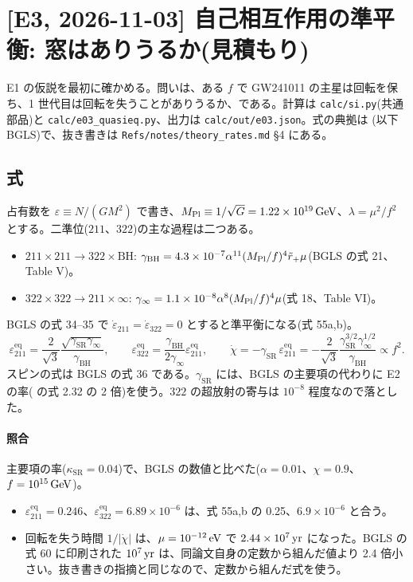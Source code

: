 \section{[E3, 2026-11-03] 自己相互作用の準平衡: 窓はありうるか(見積もり)}\label{sec:e03}

E1 の仮説を最初に確かめる。問いは、ある $f$ で GW241011 の主星は回転を保ち、1 世代目は回転を失うことがありうるか、である。計算は \texttt{calc/si.py}(共通部品)と \texttt{calc/e03\_quasieq.py}、出力は \texttt{calc/out/e03.json}。式の典拠は (以下 BGLS)で、抜き書きは \texttt{Refs/notes/theory\_rates.md} \S4 にある。

\subsection{式}

占有数を $\varepsilon\equiv N/(GM^2)$ で書き、$M_\mathrm{Pl}\equiv1/\sqrt G=1.22\times10^{19}\,\mathrm{GeV}$、$\lambda=\mu^2/f^2$ とする。二準位($211$、$322$)の主な過程は二つある。
\begin{itemize}
\item $211\times211\to322\times\mathrm{BH}$: $\gamma_\mathrm{BH}=4.3\times10^{-7}\alpha^{11}(M_\mathrm{Pl}/f)^4\tilde r_+\mu$(BGLS の式 21、Table V)。
\item $322\times322\to211\times\infty$: $\gamma_\infty=1.1\times10^{-8}\alpha^8(M_\mathrm{Pl}/f)^4\mu$(式 18、Table VI)。
\end{itemize}
BGLS の式 34--35 で $\dot\varepsilon_{211}=\dot\varepsilon_{322}=0$ とすると準平衡になる(式 55a,b)。
\begin{equation}
\varepsilon_{211}^\mathrm{eq}=\frac{2}{\sqrt3}\frac{\sqrt{\gamma_\mathrm{SR}\gamma_\infty}}{\gamma_\mathrm{BH}},\qquad
\varepsilon_{322}^\mathrm{eq}=\frac{\gamma_\mathrm{BH}}{2\gamma_\infty}\varepsilon_{211}^\mathrm{eq},\qquad
\dot\chi=-\gamma_\mathrm{SR}\,\varepsilon_{211}^\mathrm{eq}=-\frac{2}{\sqrt3}\frac{\gamma_\mathrm{SR}^{3/2}\gamma_\infty^{1/2}}{\gamma_\mathrm{BH}}\propto f^2.
\label{eq:e03_qe}
\end{equation}
スピンの式は BGLS の式 36 である。$\gamma_\mathrm{SR}$ には、BGLS の主要項の代わりに E2 の率( の式 2.32 の 2 倍)を使う。$322$ の超放射の寄与は $10^{-8}$ 程度なので落とした。

\paragraph{照合}
主要項の率($\kappa_\mathrm{SR}=0.04$)で、BGLS の数値と比べた($\alpha=0.01$、$\chi=0.9$、$f=10^{15}\,\mathrm{GeV}$)。
\begin{itemize}
\item $\varepsilon_{211}^\mathrm{eq}=0.246$、$\varepsilon_{322}^\mathrm{eq}=6.89\times10^{-6}$ は、式 55a,b の 0.25、$6.9\times10^{-6}$ と合う。
\item 回転を失う時間 $1/|\dot\chi|$ は、$\mu=10^{-12}\,\mathrm{eV}$ で $2.44\times10^7\,\mathrm{yr}$ になった。BGLS の式 60 に印刷された $10^7\,\mathrm{yr}$ は、同論文自身の定数から組んだ値より 2.4 倍小さい。抜き書きの指摘と同じなので、定数から組んだ式を使う。
\end{itemize}

